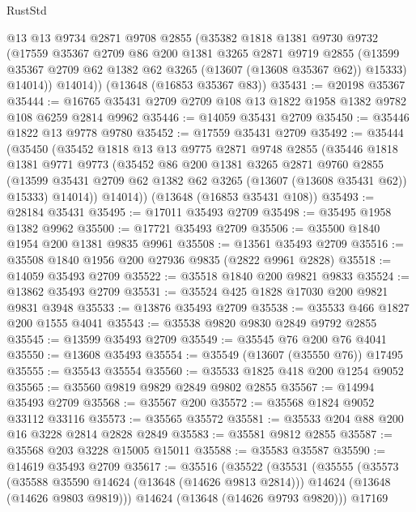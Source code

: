 \begin{lexlean}{RustStd}
\begin{coremodule}
        @13
        @13
        @9734
        @2871
        @9708
        @2855
        (@35382
          @1818
          @1381
          @9730
          @9732
          (@17559
            @35367
            @2709
            @86
            @200
            @1381
            @3265
            @2871
            @9719
            @2855
            (@13599 @35367 @2709 @62 @1382 @62 @3265 (@13607 (@13608 @35367 @62)) @15333)
            @14014))
        @14014))
    (@13648 (@16853 @35367 @83))
@35431 := @20198 @35367
@35444 := @16765 @35431 @2709 @2709 @108 @13 @1822 @1958 @1382 @9782 @108 @6259 @2814 @9962
@35446 := @14059 @35431 @2709
@35450 := @35446 @1822 @13 @9778 @9780
@35452 := @17559 @35431 @2709
@35492 := @35444
    (@35450
      (@35452
        @1818
        @13
        @13
        @9775
        @2871
        @9748
        @2855
        (@35446
          @1818
          @1381
          @9771
          @9773
          (@35452
            @86
            @200
            @1381
            @3265
            @2871
            @9760
            @2855
            (@13599 @35431 @2709 @62 @1382 @62 @3265 (@13607 (@13608 @35431 @62)) @15333)
            @14014))
        @14014))
    (@13648 (@16853 @35431 @108))
@35493 := @28184 @35431
@35495 := @17011 @35493 @2709
@35498 := @35495 @1958 @1382 @9962
@35500 := @17721 @35493 @2709
@35506 := @35500 @1840 @1954 @200 @1381 @9835 @9961
@35508 := @13561 @35493 @2709
@35516 := @35508 @1840 @1956 @200 @27936 @9835 (@2822 @9961 @2828)
@35518 := @14059 @35493 @2709
@35522 := @35518 @1840 @200 @9821 @9833
@35524 := @13862 @35493 @2709
@35531 := @35524 @425 @1828 @17030 @200 @9821 @9831 @3948
@35533 := @13876 @35493 @2709
@35538 := @35533 @466 @1827 @200 @1555 @4041
@35543 := @35538 @9820 @9830 @2849 @9792 @2855
@35545 := @13599 @35493 @2709
@35549 := @35545 @76 @200 @76 @4041
@35550 := @13608 @35493
@35554 := @35549 (@13607 (@35550 @76)) @17495
@35555 := @35543 @35554
@35560 := @35533 @1825 @418 @200 @1254 @9052
@35565 := @35560 @9819 @9829 @2849 @9802 @2855
@35567 := @14994 @35493 @2709
@35568 := @35567 @200
@35572 := @35568 @1824 @9052 @33112 @33116
@35573 := @35565 @35572
@35581 := @35533 @204 @88 @200 @16 @3228 @2814 @2828 @2849
@35583 := @35581 @9812 @2855
@35587 := @35568 @203 @3228 @15005 @15011
@35588 := @35583 @35587
@35590 := @14619 @35493 @2709
@35617 := @35516
    (@35522
      (@35531
        (@35555
          (@35573
            (@35588 @35590 @14624 (@13648 (@14626 @9813 @2814)))
            @14624
            (@13648 (@14626 @9803 @9819)))
          @14624
          (@13648 (@14626 @9793 @9820)))
        @17169

\end{coremodule}
\end{lexlean}
